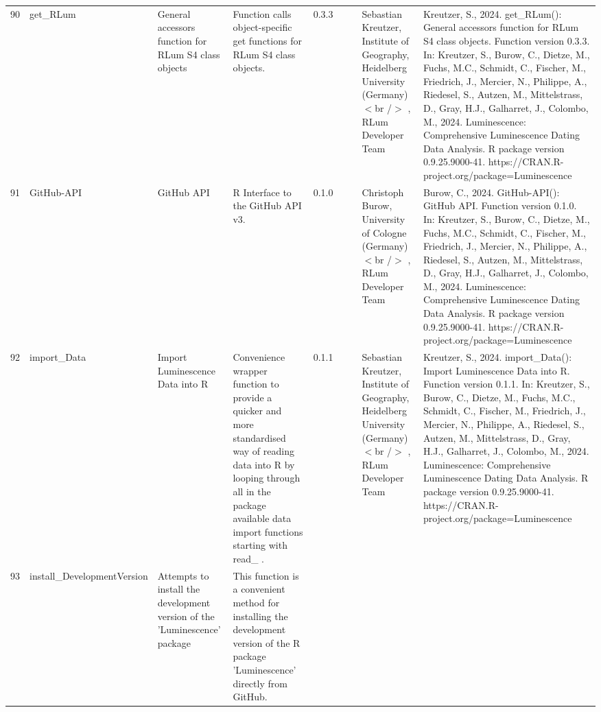 \begin{table}[ht]
\begin{tabular}{rllllllll}
 \\ 
  90 & get\_RLum & General accessors function for RLum S4 class objects & Function calls object-specific get functions for RLum S4 class objects. & 0.3.3
 &  &  & Sebastian Kreutzer, Institute of Geography, Heidelberg University (Germany)$<$br /$>$ , RLum Developer Team & Kreutzer, S., 2024. get\_RLum(): General accessors function for RLum S4 class objects. Function version 0.3.3. In: Kreutzer, S., Burow, C., Dietze, M., Fuchs, M.C., Schmidt, C., Fischer, M., Friedrich, J., Mercier, N., Philippe, A., Riedesel, S., Autzen, M., Mittelstrass, D., Gray, H.J., Galharret, J., Colombo, M., 2024. Luminescence: Comprehensive Luminescence Dating Data Analysis. R package version 0.9.25.9000-41. https://CRAN.R-project.org/package=Luminescence
 \\ 
  91 & GitHub-API & GitHub API & R Interface to the GitHub API v3. & 0.1.0
 &  &  & Christoph Burow, University of Cologne (Germany)$<$br /$>$ , RLum Developer Team & Burow, C., 2024. GitHub-API(): GitHub API. Function version 0.1.0. In: Kreutzer, S., Burow, C., Dietze, M., Fuchs, M.C., Schmidt, C., Fischer, M., Friedrich, J., Mercier, N., Philippe, A., Riedesel, S., Autzen, M., Mittelstrass, D., Gray, H.J., Galharret, J., Colombo, M., 2024. Luminescence: Comprehensive Luminescence Dating Data Analysis. R package version 0.9.25.9000-41. https://CRAN.R-project.org/package=Luminescence
 \\ 
  92 & import\_Data & Import Luminescence Data into R & Convenience wrapper function to provide a quicker and more standardised way of reading data into R by looping through all in the package available data import functions starting with  read\_ . & 0.1.1
 &  &  & Sebastian Kreutzer, Institute of Geography, Heidelberg University (Germany)$<$br /$>$ , RLum Developer Team & Kreutzer, S., 2024. import\_Data(): Import Luminescence Data into R. Function version 0.1.1. In: Kreutzer, S., Burow, C., Dietze, M., Fuchs, M.C., Schmidt, C., Fischer, M., Friedrich, J., Mercier, N., Philippe, A., Riedesel, S., Autzen, M., Mittelstrass, D., Gray, H.J., Galharret, J., Colombo, M., 2024. Luminescence: Comprehensive Luminescence Dating Data Analysis. R package version 0.9.25.9000-41. https://CRAN.R-project.org/package=Luminescence
 \\ 
  93 & install\_DevelopmentVersion & Attempts to install the development version of the 'Luminescence' package & This function is a convenient method for installing the development version of the R package 'Luminescence' directly from GitHub. &  &  &  &  &  \\ 

\end{tabular}
\end{table}
